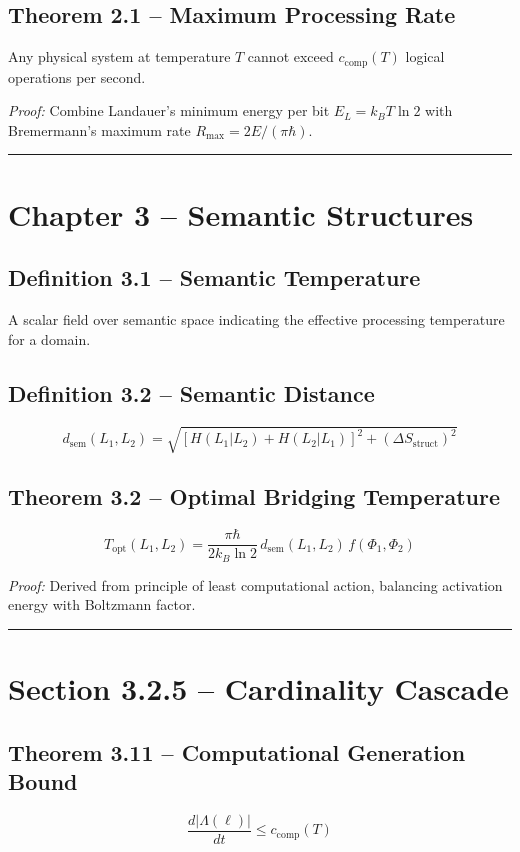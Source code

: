\documentclass{article}
\begin{document}
\subsection{Theorem 2.1 – Maximum Processing Rate}
Any physical system at temperature \(T\) cannot exceed \(c_{\mathrm{comp}}(T)\) logical operations per second.

\emph{Proof:} Combine Landauer's minimum energy per bit \(E_L = k_B T \ln 2\) with Bremermann's maximum rate \(R_{\max} = 2E/(\pi \hbar)\).

\hrule

\section{Chapter 3 – Semantic Structures}

\subsection{Definition 3.1 – Semantic Temperature}
A scalar field over semantic space indicating the effective processing temperature for a domain.

\subsection{Definition 3.2 – Semantic Distance}
\[
d_{\mathrm{sem}}(L_1, L_2) = \sqrt{[H(L_1|L_2) + H(L_2|L_1)]^2 + (\Delta S_{\mathrm{struct}})^2}
\]

\subsection{Theorem 3.2 – Optimal Bridging Temperature}
\[
T_{\mathrm{opt}}(L_1,L_2) = \frac{\pi \hbar}{2 k_B \ln 2} \, d_{\mathrm{sem}}(L_1, L_2) \, f(\Phi_1, \Phi_2)
\]

\emph{Proof:} Derived from principle of least computational action, balancing activation energy with Boltzmann factor.

\hrule

\section{Section 3.2.5 – Cardinality Cascade}

\subsection{Theorem 3.11 – Computational Generation Bound}
\[
\frac{d|\Lambda(\ell)|}{dt} \leq c_{\mathrm{comp}}(T)
\]
\end{document}
